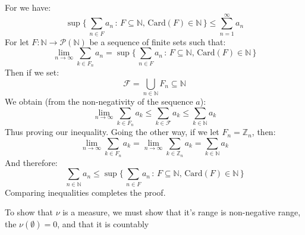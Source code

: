 \documentclass[crop=false,class=article]{standalone}                           %
\begin{document}
        \begin{solution}
            For we have:
            \begin{equation}
                \sup\Big\{\,\sum_{n\in{F}}a_{n}\,:\,F\subseteq\mathbb{N},\,
                    \textrm{Card}(F)\in\mathbb{N}\,\Big\}
                \leq\sum_{n=1}^{\infty}a_{n}
            \end{equation}
            For let $F:\mathbb{N}\rightarrow\mathcal{P}(\mathbb{N})$ be a sequence
            of finite sets such that:
            \begin{equation}
                \underset{n\rightarrow\infty}{\lim}
                    \sum_{k\in{F}_{n}}a_{n}
                =\sup\Big\{\,\sum_{n\in{F}}a_{n}\,:\,F\subseteq\mathbb{N},\,
                    \textrm{Card}(F)\in\mathbb{N}\,\Big\}
            \end{equation}
            Then if we set:
            \begin{equation}
                \mathcal{F}=\bigcup_{n\in\mathbb{N}}F_{n}\subseteq\mathbb{N}
            \end{equation}
            We obtain (from the non-negativity of the sequence $a$):
            \begin{equation}
                \underset{n\rightarrow\infty}{\lim}\sum_{k\in{F}_{n}}a_{k}
                    \leq\sum_{k\in\mathcal{F}}a_{k}
                    \leq\sum_{k\in\mathbb{N}}a_{k}
            \end{equation}
            Thus proving our inequality. Going the other way, if we let
            $F_{n}=\mathbb{Z}_{n}$, then:
            \begin{equation}
                \underset{n\rightarrow\infty}{\lim}\sum_{k\in{F}_{n}}a_{k}
                =\underset{n\rightarrow\infty}{\lim}\sum_{k\in\mathbb{Z}_{n}}a_{k}
                =\sum_{k\in\mathbb{N}}a_{k}
            \end{equation}
            And therefore:
            \begin{equation}
                \sum_{n\in\mathbb{N}}a_{n}\leq
                \sup\Big\{\,\sum_{n\in{F}}a_{n}\,:\,F\subseteq\mathbb{N},\,
                    \textrm{Card}(F)\in\mathbb{N}\,\Big\}
            \end{equation}
            Comparing inequalities completes the proof.
            \par\hfill\par
            To show that $\nu$ is a measure, we must show that it's range is
            non-negative range, the $\nu(\emptyset)=0$, and that it is countably

\end{solution}
\end{document}
